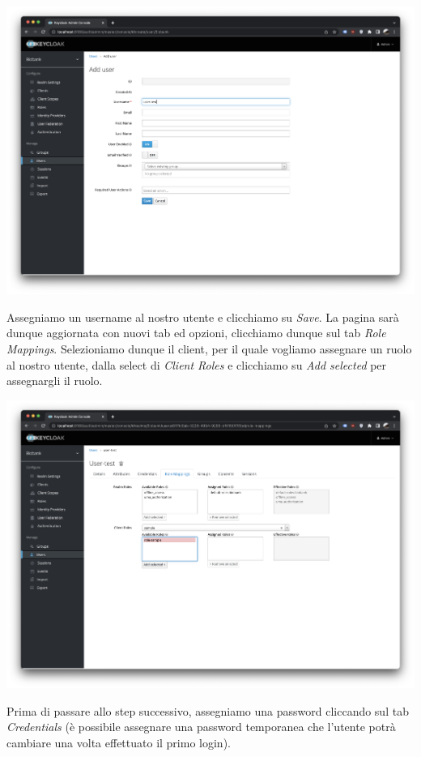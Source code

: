 \documentclass{article}
\begin{document}
\begin{center}
    \includegraphics[width=0.80\linewidth]{keycloak_12.png}
\end{center}

Assegniamo un username al nostro utente e clicchiamo su \textit{Save}. La pagina sarà dunque aggiornata con nuovi tab ed opzioni, clicchiamo dunque sul tab \textit{Role Mappings}.
Selezioniamo dunque il client, per il quale vogliamo assegnare un ruolo al nostro utente, dalla select di \textit{Client Roles} e clicchiamo su \textit{Add selected} per assegnargli il ruolo.

\begin{center}
    \includegraphics[width=0.80\linewidth]{keycloak_13.png}
\end{center}

Prima di passare allo step successivo, assegniamo una password cliccando sul tab \textit{Credentials} (è possibile assegnare una password temporanea che l'utente potrà cambiare una volta effettuato il primo login).
\end{document}
